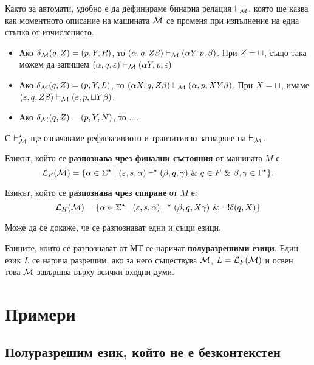 Както за автомати, удобно е да дефинираме бинарна релация $\vdash_{\mathcal{M}}$,
която ще казва как моментното описание на машината $\mathcal{M}$ се променя при 
изпълнение на една стъпка от изчислението.
\begin{itemize}
\item
  Ако $\delta_{\mathcal{M}}(q,Z) = (p,Y,R)$, то $(\alpha, q, Z\beta) \vdash_{\mathcal{M}} (\alpha Y, p, \beta)$.
  При $Z = \sqcup$, също така можем да запишем 
  $(\alpha, q, \varepsilon) \vdash_{\mathcal{M}} (\alpha Y, p, \varepsilon)$
\item 
  Ако $\delta_{\mathcal{M}}(q,Z) = (p,Y,L)$, то $(\alpha X, q, Z\beta) \vdash_{\mathcal{M}} (\alpha , p, XY\beta)$.
  При $X = \sqcup$, имаме $(\varepsilon, q, Z\beta) \vdash_{\mathcal{M}} (\varepsilon, p, \sqcup Y\beta)$.
\item
  Ако $\delta_{\mathcal{M}}(q,Z) = (p,Y,N)$, то ....
\end{itemize}
С $\vdash^\star_{\mathcal{M}}$ ще означаваме рефлексивното и транзитивно затваряне на $\vdash_{\mathcal{M}}$.

Езикът, който се {\bf разпознава чрез финални състояния} от машината $M$ е:
\[\mathcal{L}_F(\mathcal{M}) = \{\alpha\in\Sigma^\star \mid (\varepsilon, s, \alpha) \vdash^\star (\beta, q, \gamma)\ \&\ q\in F\ \&\ \beta,\gamma\in\Gamma^\star\}.\]

Езикът, който се {\bf разпознава чрез спиране} от $M$ е:
\[\L_H(\M) = \{\alpha \in \Sigma^\star \mid (\varepsilon, s, \alpha) \vdash^\star (\beta, q, X\gamma)\ \&\ \neg !\delta(q,X)\}\]

Може да се докаже, че се разпознават едни и същи езици.

Езиците, които се разпознават от МТ се наричат {\bf полуразрешими езици}.
Един език $L$ се нарича разрешим, ако за него съществува $\mathcal{M}$, $L = \mathcal{L}_F(\mathcal{M})$
и освен това $\mathcal{M}$ завършва върху всички входни думи.

\section{Примери}

\subsection*{Полуразрешим език, който не е безконтекстен}

